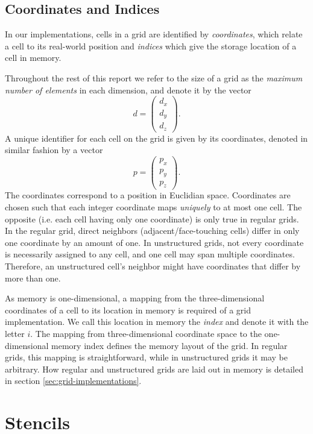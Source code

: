 \subsection{Coordinates and Indices}

In our implementations, cells in a grid are identified by \emph{coordinates}, which relate a cell to its real-world position and \emph{indices} which give the storage location of a cell in memory. 

Throughout the rest of this report we refer to the size of a grid as the \emph{maximum number of elements} in each dimension, and denote it by the vector
$$d = \begin{pmatrix}d_x \\ d_y \\ d_z\end{pmatrix}.$$
A unique identifier for each cell on the grid is given by its coordinates, denoted in similar fashion by a vector
$$p = \begin{pmatrix}p_x \\ p_y \\ p_z\end{pmatrix}.$$
The coordinates correspond to a position in Euclidian space. Coordinates are chosen such that each integer coordinate maps \emph{uniquely} to at most one cell. The opposite (i.e. each cell having only one coordinate) is only true in regular grids. In the regular grid, direct neighbors (adjacent/face-touching cells) differ in only one coordinate by an amount of one. In unstructured grids, not every coordinate is necessarily assigned to any cell, and one cell may span multiple coordinates. Therefore, an unstructured cell's neighbor might have coordinates that differ by more than one.

As memory is one-dimensional, a mapping from the three-dimensional coordinates of a cell to its location in memory is required of a grid implementation. We call this location in memory the \emph{index} and denote it with the letter $i$. The mapping from three-dimensional coordinate space to the one-dimensional memory index defines the memory layout of the grid. In regular grids, this mapping is straightforward, while in unstructured grids it may be arbitrary. How regular and unstructured grids are laid out in memory is detailed in section \ref{sec:grid-implementations}.

\section{Stencils}                                    \label{sec:stencils}

